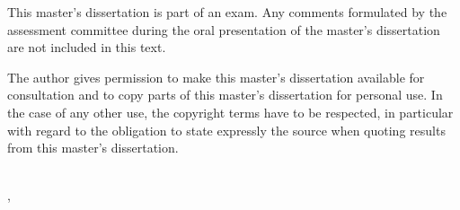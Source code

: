 \clearpage
\thispagestyle{empty}

\vspace*{\fill}

\noindent
This master's dissertation is part of an exam.
Any comments formulated by the assessment committee during the oral presentation of the master's dissertation are not included in this text.

\vspace{0.5cm}

\noindent
The author gives permission to make this master's dissertation available for consultation and to copy parts of this master's dissertation for personal use.
In the case of any other use, the copyright terms have to be respected, in particular with regard to the obligation to state expressly the source when quoting results from this master's dissertation.

\vspace{1cm}

\noindent
\authorname \\
\place, \submissiondate

\vspace*{2cm}